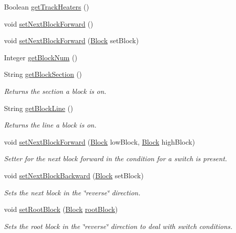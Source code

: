 \begin{DoxyCompactItemize}
Boolean \hyperlink{classTrackModel_1_1Block_a43a18b38c61438d59621511020559b11}{get\+Track\+Heaters} ()
\item 
void \hyperlink{classTrackModel_1_1Block_a5b78735684cbae8d24cea8874f27e5bd}{set\+Next\+Block\+Forward} ()
\item 
void \hyperlink{classTrackModel_1_1Block_a01715a2edb54f2a6791f95e81e613f2b}{set\+Next\+Block\+Forward} (\hyperlink{classTrackModel_1_1Block}{Block} set\+Block)
\item 
Integer \hyperlink{classTrackModel_1_1Block_a715fbe2efb7d55f92eab33cb635a4a00}{get\+Block\+Num} ()
\item 
String \hyperlink{classTrackModel_1_1Block_a2733e908ed59561bcb58ada3dd6045ab}{get\+Block\+Section} ()
\begin{DoxyCompactList}\small\item\em Returns the section a block is on. \end{DoxyCompactList}\item 
String \hyperlink{classTrackModel_1_1Block_a6f5a001898b82c18e371aebeca433eec}{get\+Block\+Line} ()
\begin{DoxyCompactList}\small\item\em Returns the line a block is on. \end{DoxyCompactList}\item 
void \hyperlink{classTrackModel_1_1Block_a737780636e43298572855b15fc3b20d5}{set\+Next\+Block\+Forward} (\hyperlink{classTrackModel_1_1Block}{Block} low\+Block, \hyperlink{classTrackModel_1_1Block}{Block} high\+Block)
\begin{DoxyCompactList}\small\item\em Setter for the next block forward in the condition for a switch is present. \end{DoxyCompactList}\item 
void \hyperlink{classTrackModel_1_1Block_ad0364d9a5fb2741523cca7abd356d3e9}{set\+Next\+Block\+Backward} (\hyperlink{classTrackModel_1_1Block}{Block} set\+Block)
\begin{DoxyCompactList}\small\item\em Sets the next block in the \char`\"{}reverse\char`\"{} direction. \end{DoxyCompactList}\item 
void \hyperlink{classTrackModel_1_1Block_a07ebf377b8be2509705a1fbb5e48e98b}{set\+Root\+Block} (\hyperlink{classTrackModel_1_1Block}{Block} \hyperlink{classTrackModel_1_1Block_a400d119c96231f6cf5db4accbf48cb84}{root\+Block})
\begin{DoxyCompactList}\small\item\em Sets the root block in the \char`\"{}reverse\char`\"{} direction to deal with switch conditions. \end{DoxyCompactList}\item 

\end{DoxyCompactItemize}
